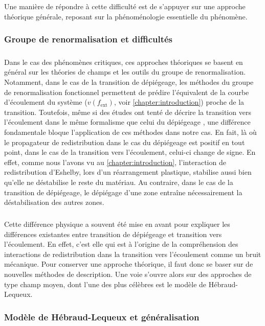 \subparagraph{}Une manière de répondre à cette difficulté est de s'appuyer sur une approche théorique générale, reposant sur la phénoménologie essentielle du phénomène.

\subsubsection{Groupe de renormalisation et difficultés}

\label{sec:TheoEPM}

\subparagraph{}Dans le cas des phénomènes critiques, ces approches théoriques se basent en général sur les théories de champs et les outils du groupe de renormalisation. Notamment, dans le cas de la transition de dépiégeage, les méthodes du groupe de renormalisation fonctionnel permettent de prédire l'équivalent de la courbe d'écoulement du système ($v(f_\text{ext})$, voir \autoref{chapter:introduction}) proche de la transition. Toutefois, même si des études ont tenté de décrire la transition vers l'écoulement dans le même formalisme que celui du dépiégeage \cite{tyukodi_depinning_2016}, une différence fondamentale bloque l'application de ces méthodes dans notre cas. En fait, là où le propagateur de redistribution dans le cas du dépiégeage est positif en tout point, dans le cas de la transition vers l'écoulement, celui-ci change de signe. En effet, comme nous l'avons vu au \autoref{chapter:introduction}, l'interaction de redistribution d'Eshelby, lors d'un réarrangement plastique, stabilise aussi bien qu'elle ne déstabilise le reste du matériau. Au contraire, dans le cas de la transition de dépiégeage, le dépiégage d'une zone entraîne nécessairement la déstabilisation des autres zones.

\subparagraph{}Cette différence physique a souvent été mise en avant pour expliquer les différences existantes entre transition de dépiégeage et transition vers l'écoulement. En effet, c'est elle qui est à l'origine de la compréhension des interactions de redistribution dans la transition vers l'écoulement comme un bruit mécanique. Pour conserver une approche théorique, il faut donc se baser sur de nouvelles méthodes de description. Une voie s'ouvre alors sur des approches de type champ moyen, dont l'une des plus célèbres est le modèle de Hébraud-Lequeux.

\subsubsection{Modèle de Hébraud-Lequeux et généralisation}

